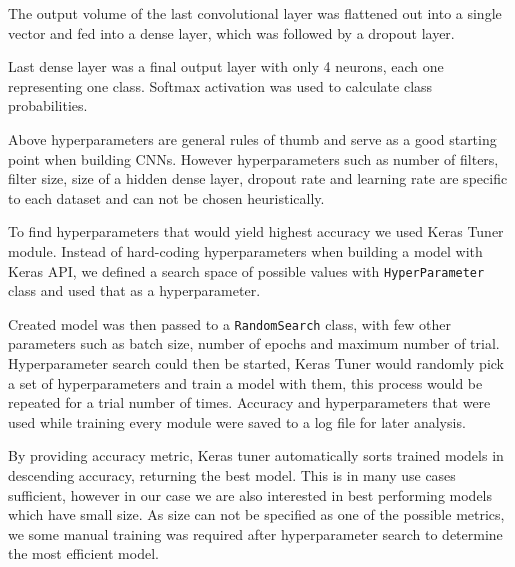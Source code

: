 The output volume of the last convolutional layer was flattened out into a single vector and fed into a dense layer, which was followed by a dropout layer\footnotemark.


Last dense layer was a final output layer with only 4 neurons, each one representing one class.
Softmax activation was used to calculate class probabilities.

Above hyperparameters are general rules of thumb and serve as a good starting point when building CNNs\cite{cs231n}.
However hyperparameters such as number of filters, filter size, size of a hidden dense layer, dropout rate and learning rate are specific to each dataset and can not be chosen heuristically.

To find hyperparameters that would yield highest accuracy we used Keras Tuner module.
Instead of hard-coding hyperparameters when building a model with Keras API, we defined a search space of possible values with \verb|HyperParameter| class and used that as a hyperparameter.

Created model was then passed to a \verb|RandomSearch| class, with few other parameters such as batch size, number of epochs and maximum number of trial.
Hyperparameter search could then be started, Keras Tuner would randomly pick a set of hyperparameters and train a model with them, this process would be repeated for a trial number of times.
Accuracy and hyperparameters that were used while training every module were saved to a log file for later analysis.

By providing accuracy metric, Keras tuner automatically sorts trained models in descending accuracy, returning the best model.
This is in many use cases sufficient, however in our case we are also interested in best performing models which have small size. 
As size can not be specified as one of the possible metrics, we some manual training was required after hyperparameter search to determine the most efficient model.


